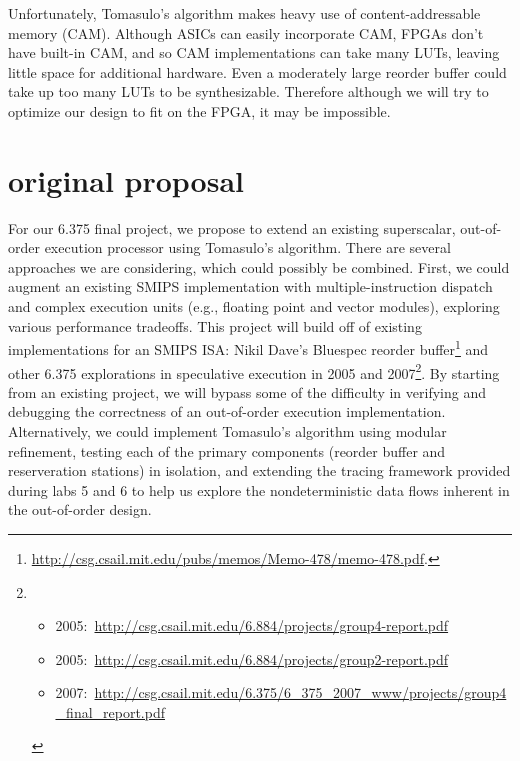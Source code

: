 \documentclass[12pt]{article}
\begin{document}
Unfortunately, Tomasulo's algorithm makes heavy use of content-addressable memory (CAM). Although ASICs can easily incorporate CAM, FPGAs don't have built-in CAM, and so CAM
implementations can take many LUTs, leaving little space for additional hardware. Even a moderately large reorder buffer could take up too many LUTs to be synthesizable. Therefore
although we will try to optimize our design to fit on the FPGA, it may be impossible.

\section{original proposal}

  For our 6.375 final project, we propose to extend an existing superscalar, out-of-order execution processor using Tomasulo's algorithm. There are several approaches we are considering, which could possibly be combined. First, we could augment an existing SMIPS implementation with multiple-instruction dispatch and complex execution units (e.g., floating point and vector modules), exploring various performance tradeoffs. This project will build off of existing implementations for an SMIPS ISA: Nikil Dave's  Bluespec reorder buffer\footnote{\url{http://csg.csail.mit.edu/pubs/memos/Memo-478/memo-478.pdf}.} and other 6.375 explorations in speculative execution in 2005 and 2007\footnote{\begin{itemize}
    \item 2005:~\url{http://csg.csail.mit.edu/6.884/projects/group4-report.pdf}
    \item 2005:~\url{http://csg.csail.mit.edu/6.884/projects/group2-report.pdf}
    \item 2007:~\url{http://csg.csail.mit.edu/6.375/6_375_2007_www/projects/group4_final_report.pdf}
  \end{itemize}}. By starting from an existing project, we will bypass some of the difficulty in verifying and debugging the correctness of an out-of-order execution implementation. Alternatively, we could implement Tomasulo's algorithm using modular refinement, testing each of the primary components (reorder buffer and reserveration stations) in isolation, and extending the tracing framework provided during labs 5 and 6 to help us explore the nondeterministic data flows inherent in the out-of-order design.
  
\end{document}
